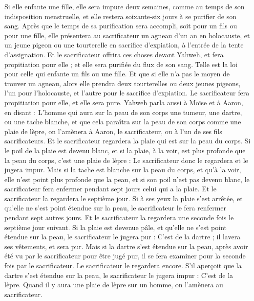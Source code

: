 \begin{multicols}{2}
Si elle enfante une fille, elle sera impure deux semaines, comme au temps de son indisposition menstruelle, et elle restera soixante-six jours à se purifier de son sang.
Après que le temps de sa purification sera accompli, soit pour un fils ou pour une fille, elle présentera au sacrificateur un agneau d'un an en holocauste, et un jeune pigeon ou une tourterelle en sacrifice d’expiation, à l'entrée de la tente d'assignation.
Et le sacrificateur offrira ces choses devant Yahweh, et fera propitiation pour elle ; et elle sera purifiée du flux de son sang. Telle est la loi pour celle qui enfante un fils ou une fille.
Et que si elle n'a pas le moyen de trouver un agneau, alors elle prendra deux tourterelles ou deux jeunes pigeons, l'un pour l'holocauste, et l'autre pour le sacrifice d'expiation. Le sacrificateur fera propitiation pour elle, et elle sera pure.
\VerseOne{}Yahweh parla aussi à Moïse et à Aaron, en disant :
L'homme qui aura sur la peau de son corps une tumeur, une dartre, ou une tache blanche, et que cela paraîtra sur la peau de son corps comme une plaie de lèpre, on l'amènera à Aaron, le sacrificateur, ou à l'un de ses fils sacrificateurs.
Et le sacrificateur regardera la plaie qui est sur la peau du corps. Si le poil de la plaie est devenu blanc, et si la plaie, à la voir, est plus profonde que la peau du corps, c'est une plaie de lèpre : Le sacrificateur donc le regardera et le jugera impur.
Mais si la tache est blanche sur la peau du corps, et qu'à la voir, elle n'est point plus profonde que la peau, et si son poil n'est pas devenu blanc, le sacrificateur fera enfermer pendant sept jours celui qui a la plaie.
Et le sacrificateur la regardera le septième jour. Si à ses yeux la plaie s'est arrêtée, et qu'elle ne s'est point étendue sur la peau, le sacrificateur le fera renfermer pendant sept autres jours.
Et le sacrificateur la regardera une seconde fois le septième jour suivant. Si la plaie est devenue pâle, et qu'elle ne s'est point étendue sur la peau, le sacrificateur le jugera pur : C'est de la dartre ; il lavera ses vêtements, et sera pur.
Mais si la dartre s'est étendue sur la peau, après avoir été vu par le sacrificateur pour être jugé pur, il se fera examiner pour la seconde fois par le sacrificateur.
Le sacrificateur le regardera encore. S'il aperçoit que la dartre s'est étendue sur la peau, le sacrificateur le jugera impur : C'est de la lèpre.
Quand il y aura une plaie de lèpre sur un homme, on l'amènera au sacrificateur.

\end{multicols}
